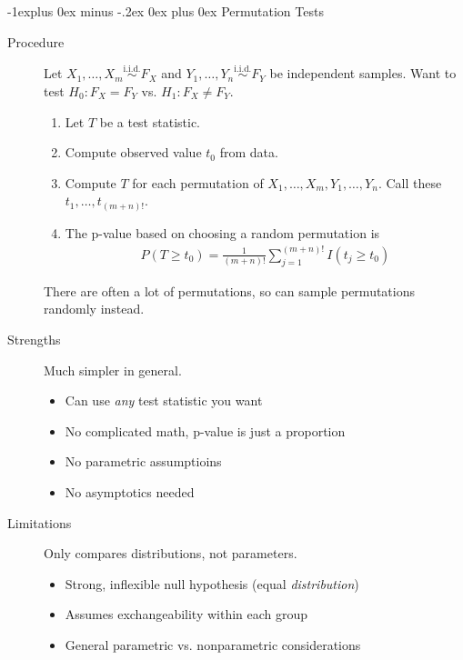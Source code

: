 \documentclass[10pt,landscape]{article}
\makeatletter
\renewcommand{\subsection}{\@startsection{subsection}{2}{0mm}%
                                {-1explus 0ex minus -.2ex}%
                                {0ex plus 0ex}%
                                {\normalfont\small\bfseries}}
\makeatother
\begin{document}
\begin{multicols*}{3}
\subsection{Permutation Tests}
\begin{description}
\item[Procedure]
Let $X_1, \dots, X_m \stackrel{\text{i.i.d.}}{\sim} F_X$ and $Y_1, \dots, Y_n \stackrel{\text{i.i.d.}}{\sim} F_Y$ be independent samples. Want to test $H_0 : F_X = F_Y$ vs. $H_1 : F_X \neq F_Y$.
\begin{enumerate}
\item Let $T$ be a test statistic.
\item Compute observed value $t_0$ from data. 
\item Compute $T$ for each permutation of $X_1, \dots, X_m, Y_1, \dots, Y_n$. Call these $t_1, \dots, t_{(m + n)!}$.
\item The p-value based on choosing a random permutation is
\begin{align*}
    P(T \geq t_0) = \frac{1}{(m + n)!} \sum_{j = 1}^{(m + n)!} I(t_j \geq t_0)
\end{align*}
\end{enumerate}
There are often a lot of permutations, so can sample permutations randomly instead. 
\item[Strengths] Much simpler in general.
\begin{itemize}
    \item Can use \textit{any} test statistic you want
    \item No complicated math, p-value is just a proportion
    \item No parametric assumptioins
    \item No asymptotics needed
\end{itemize} 
\item[Limitations] Only compares distributions, not parameters. 
\begin{itemize}
    \item Strong, inflexible null hypothesis (equal \textit{distribution})
    \item Assumes exchangeability within each group
    \item General parametric vs. nonparametric considerations
\end{itemize} 
\end{description}


\end{multicols*}
\end{document}
